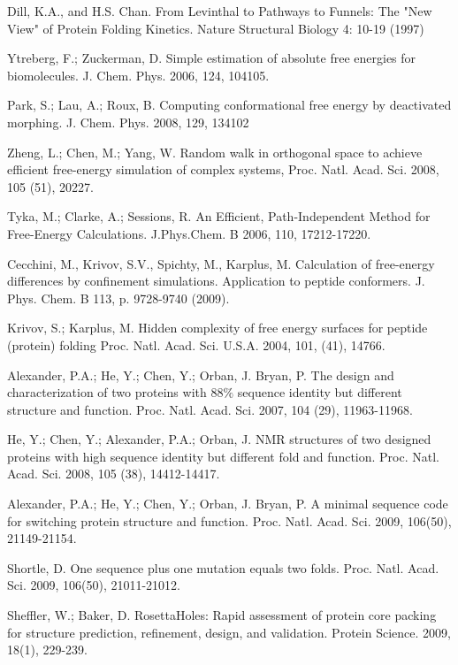 \documentclass[12pt]{article}
\begin{document}
\begin{thebibliography}{99}

Dill, K.A., and H.S. Chan.  From Levinthal to Pathways to Funnels:  The "New View" of Protein Folding Kinetics.  Nature Structural Biology 4: 10-19 (1997)


Ytreberg, F.; Zuckerman, D. Simple estimation of absolute free energies for biomolecules. J. Chem. Phys. 2006, 124, 104105.

Park, S.; Lau, A.; Roux, B. Computing conformational free energy by deactivated morphing. J. Chem. Phys. 2008, 129, 134102

Zheng, L.; Chen, M.; Yang, W. Random walk in orthogonal space to achieve efficient free-energy simulation of complex systems, Proc. Natl. Acad. Sci. 2008, 105 (51), 20227.

Tyka, M.; Clarke, A.; Sessions, R. An Efficient, Path-Independent Method for Free-Energy Calculations. J.Phys.Chem. B 2006, 110, 17212-17220.

Cecchini, M., Krivov, S.V., Spichty, M., Karplus, M. Calculation of free-energy differences by confinement simulations. Application to peptide conformers. 
J. Phys. Chem. B 113, p. 9728-9740 (2009).

Krivov, S.; Karplus, M. Hidden complexity of free energy surfaces for peptide (protein) folding Proc. Natl. Acad. Sci. U.S.A. 2004, 101, (41), 14766.

Alexander, P.A.; He, Y.; Chen, Y.; Orban, J. Bryan, P. The design and characterization of two proteins with $88 \%$ sequence identity but different 
structure and function. Proc. Natl. Acad. Sci. 2007, 104 (29), 11963-11968.

He, Y.; Chen, Y.; Alexander, P.A.; Orban, J. NMR structures of two designed proteins with high sequence identity but different fold and function. Proc. Natl. Acad. Sci. 2008, 105 (38), 14412-14417.

Alexander, P.A.; He, Y.; Chen, Y.; Orban, J. Bryan, P. A minimal sequence code for switching protein structure and function. Proc. Natl. Acad. Sci. 2009, 106(50), 21149-21154.

Shortle, D. One sequence plus one mutation equals two folds. Proc. Natl. Acad. Sci. 2009, 106(50), 21011-21012. 

Sheffler, W.; Baker, D. RosettaHoles: Rapid assessment of protein core packing for structure prediction, refinement, design, and validation. Protein Science. 2009, 18(1), 229-239.

\end{thebibliography}
\end{document}
